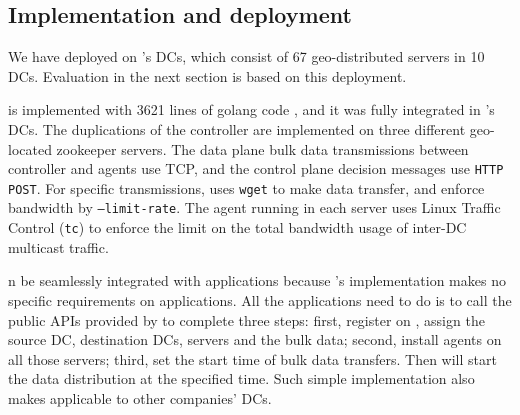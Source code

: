 \subsection{Implementation and deployment}
\label{sec:deployment}


We have deployed \name on \company's DCs, which consist of 67 geo-distributed servers in 10 DCs. Evaluation in the next section is based on this deployment. %

\name is implemented with 3621 lines of golang code \cite{golang}, and it was fully integrated in \company's DCs. The duplications of the controller are implemented on three different geo-located zookeeper servers.
The data plane bulk data transmissions between controller and agents use TCP, and the control plane decision messages use \texttt{HTTP POST}. For specific transmissions, \name uses \texttt{wget} to make data transfer, and enforce bandwidth by \texttt{--limit-rate}.
The agent running in each server uses Linux Traffic Control (\texttt{tc}) to enforce the limit on the total bandwidth usage of inter-DC multicast traffic.



\name n be seamlessly integrated with applications because \name's implementation makes no specific requirements on applications. All the applications need to do is to call the public APIs provided by \name to complete three steps: first, register on \name, assign the source DC, destination DCs, servers and the bulk data; second, install agents on all those servers; third, set the start time of bulk data transfers. Then \name will start the data distribution at the specified time. Such simple implementation also makes \name applicable to other companies' DCs. 	


